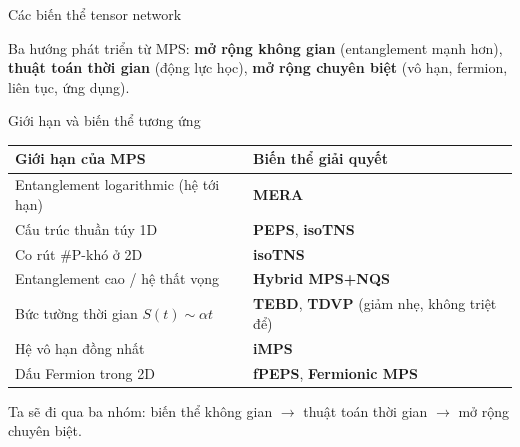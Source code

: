 \documentclass[aspectratio=169, 11pt]{beamer}
\begin{document}
\begin{frame}[shrink=8]{Các biến thể tensor network}

\vspace{4pt}
{\small Ba hướng phát triển từ MPS: \textcolor{qpurple}{\textbf{mở rộng không gian}} (entanglement mạnh hơn), \textcolor{qgreen}{\textbf{thuật toán thời gian}} (động lực học), \textcolor{qamber}{\textbf{mở rộng chuyên biệt}} (vô hạn, fermion, liên tục, ứng dụng).}

\end{frame}

\begin{frame}[shrink=3]{Giới hạn và biến thể tương ứng}

\vspace{6pt}
\begin{center}
{\small
\renewcommand{\arraystretch}{1.5}
\begin{tabular}{@{}l@{\quad$\longrightarrow$\quad}l@{}}
\toprule
\textbf{Giới hạn của MPS} & \textbf{Biến thể giải quyết} \\
\midrule
Entanglement logarithmic (hệ tới hạn) & \textcolor{qpurple}{\textbf{MERA}} \\
Cấu trúc thuần túy 1D & \textcolor{qpink}{\textbf{PEPS}}, \textcolor{qgreen}{\textbf{isoTNS}} \\
Co rút \#P-khó ở 2D & \textcolor{qgreen}{\textbf{isoTNS}} \\
Entanglement cao / hệ thất vọng & \textcolor{qamber}{\textbf{Hybrid MPS+NQS}} \\
Bức tường thời gian $S(t)\sim\alpha t$ & \textcolor{qgreen}{\textbf{TEBD}}, \textcolor{qgreen}{\textbf{TDVP}} {\footnotesize (giảm nhẹ, không triệt để)} \\
Hệ vô hạn đồng nhất & \textcolor{qamber}{\textbf{iMPS}} \\
Dấu Fermion trong 2D & \textcolor{qpink}{\textbf{fPEPS}}, \textcolor{qamber}{\textbf{Fermionic MPS}} \\
\bottomrule
\end{tabular}}
\end{center}

\vspace{6pt}
{\small Ta sẽ đi qua ba nhóm: \textcolor{qpurple}{biến thể không gian} $\to$ \textcolor{qgreen}{thuật toán thời gian} $\to$ \textcolor{qamber}{mở rộng chuyên biệt}.}

\end{frame}
\end{document}
